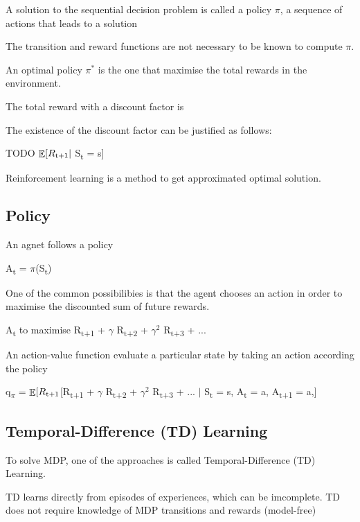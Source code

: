 \documentclass[12pt,twoside]{report}
\DeclareMathOperator{\E}{\mathbb{E}}
\begin{document}
A solution to the sequential decision problem is called a policy $\pi$, a sequence of actions that leads to a solution

The transition and reward functions are not necessary to be known to compute $\pi$.

An optimal policy $\pi^*$ is the one that maximise the total rewards in the environment.

The total reward with a discount factor is



The existence of the discount factor can be justified as follows:

TODO
$\displaystyle \E[R\textsubscript{t+1} \vert$ S\textsubscript{t} = s]


Reinforcement learning is a method to get approximated optimal solution.


\subsection{Policy}

An agnet follows a policy

A\textsubscript{t} = $\pi$(S\textsubscript{t})

One of the common possibilibies is that the agent chooses an action in order to maximise the discounted sum of future rewards. 

A\textsubscript{t} to maximise R\textsubscript{t+1} + $\gamma$ R\textsubscript{t+2} + $\gamma^2$ R\textsubscript{t+3} + ...


An action-value function evaluate a particular state by taking an action according the policy 

q\textsubscript{$\pi$} = $\displaystyle \E[R\textsubscript{t+1} $[R\textsubscript{t+1} + $\gamma$ R\textsubscript{t+2} + $\gamma^2$ R\textsubscript{t+3} + ... $\vert$ S\textsubscript{t} = s, A\textsubscript{t} = a, A\textsubscript{t+1 } = a,]




\subsection{Temporal-Difference (TD) Learning}

To solve MDP, one of the approaches is called Temporal-Difference (TD) Learning.

TD learns directly from episodes of experiences, which can be imcomplete.
TD does not require knowledge of MDP transitions and rewards (model-free)
\end{document}
